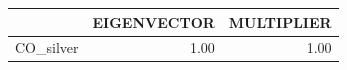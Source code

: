 \begin{tabular}{rrr}
  \hline
 & EIGENVECTOR & MULTIPLIER \\ 
  \hline
CO\_silver & 1.00 & 1.00 \\ 
   \hline
\end{tabular}
